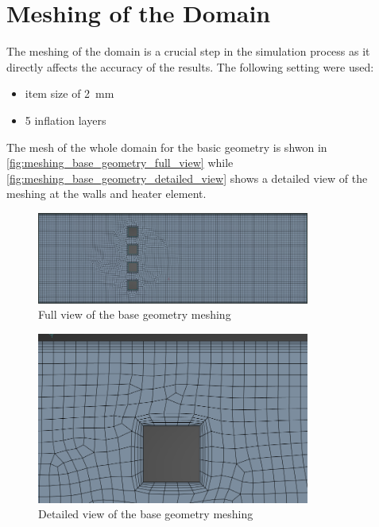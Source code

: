 \chapter{Meshing of the Domain}
\label{chapter:meshing}

The meshing of the domain is a crucial step in the simulation process as it directly affects the accuracy of the results. 
The following setting were used:
\begin{itemize}
    \item item size of \qty{2}{\milli\meter}
    \item 5 inflation layers
\end{itemize}

The mesh of the whole domain for the basic geometry is shwon in \autoref{fig:meshing_base_geometry_full_view} while \autoref{fig:meshing_base_geometry_detailed_view} shows a detailed view of the meshing at the walls and heater element.


\begin{figure}[htbp]   
    \centering
    \includegraphics[width=0.8\textwidth]{img/meshing_base_geometry_full_view}
    \caption{Full view of the base geometry meshing}
    \label{fig:meshing_base_geometry_full_view}
\end{figure}


\begin{figure}[htbp]
    \centering
    \includegraphics[width=0.8\textwidth]{img/meshing_base_geometry_detailed_view}
    \caption{Detailed view of the base geometry meshing}
    \label{fig:meshing_base_geometry_detailed_view}
\end{figure}

